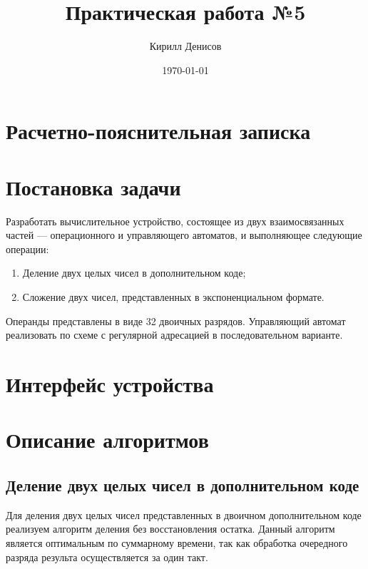 \documentclass[a4paper,14pt]{extarticle}
\author{Кирилл Денисов}
\title{Практическая работа №5}
\date{\today}
\newcommand{\pathToCommonFolder}{../../Common}
\begin{document}
	\thispagestyle{empty}
	
	
	\newpage
	\tableofcontents
	\newpage
	
\section*{Расчетно-пояснительная записка}
\section{Постановка задачи}
Разработать вычислительное устройство, состоящее из  двух взаимосвязанных частей --- операционного и управляющего автоматов, и выполняющее следующие операции:
\begin{enumerate}
	\item Деление двух целых чисел в дополнительном коде;
	\item Сложение двух чисел, представленных в экспоненциальном формате.
\end{enumerate}
Операнды представлены в виде 32 двоичных разрядов. Управляющий автомат реализовать по схеме с регулярной адресацией в последовательном варианте.
\section{Интерфейс устройства}
\section{Описание алгоритмов}
\subsection{Деление двух целых чисел в дополнительном коде}
Для деления двух целых чисел представленных в двоичном дополнительном коде реализуем алгоритм деления без восстановления остатка. Данный алгоритм является оптимальным по суммарному времени, так как обработка очередного разряда результа осуществляется за один такт.
\end{document}

